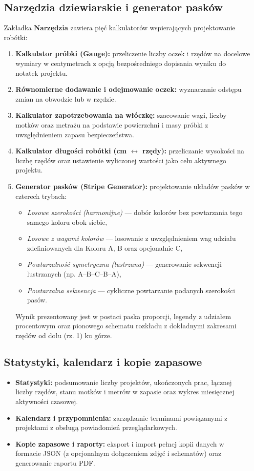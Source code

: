 \documentclass[11pt, a4paper]{article}
\begin{document}
\subsection{Narzędzia dziewiarskie i generator pasków}
Zakładka \textbf{Narzędzia} zawiera pięć kalkulatorów wspierających projektowanie robótki:
\begin{enumerate}
  \item \textbf{Kalkulator próbki (Gauge):} przeliczenie liczby oczek i rzędów na docelowe wymiary w centymetrach z opcją bezpośredniego dopisania wyniku do notatek projektu.
  \item \textbf{Równomierne dodawanie i odejmowanie oczek:} wyznaczanie odstępu zmian na obwodzie lub w rzędzie.
  \item \textbf{Kalkulator zapotrzebowania na włóczkę:} szacowanie wagi, liczby motków oraz metrażu na podstawie powierzchni i masy próbki z uwzględnieniem zapasu bezpieczeństwa.
  \item \textbf{Kalkulator długości robótki (cm $\leftrightarrow$ rzędy):} przeliczanie wysokości na liczbę rzędów oraz ustawienie wyliczonej wartości jako celu aktywnego projektu.
  \item \textbf{Generator pasków (Stripe Generator):} projektowanie układów pasków w czterech trybach:
    \begin{itemize}
      \item \textit{Losowe szerokości (harmonijne)} --- dobór kolorów bez powtarzania tego samego koloru obok siebie,
      \item \textit{Losowe z wagami kolorów} --- losowanie z uwzględnieniem wag udziału zdefiniowanych dla Koloru A, B oraz opcjonalnie C,
      \item \textit{Powtarzalność symetryczna (lustrzana)} --- generowanie sekwencji lustrzanych (np. A--B--C--B--A),
      \item \textit{Powtarzalna sekwencja} --- cykliczne powtarzanie podanych szerokości pasów.
    \end{itemize}
    Wynik prezentowany jest w postaci paska proporcji, legendy z udziałem procentowym oraz pionowego schematu rozkładu z dokładnymi zakresami rzędów od dołu (rz. 1) ku górze.
\end{enumerate}

\subsection{Statystyki, kalendarz i kopie zapasowe}
\begin{itemize}
  \item \textbf{Statystyki:} podsumowanie liczby projektów, ukończonych prac, łącznej liczby rzędów, stanu motków i metrów w zapasie oraz wykres miesięcznej aktywności czasowej.
  \item \textbf{Kalendarz i przypomnienia:} zarządzanie terminami powiązanymi z projektami z obsługą powiadomień przeglądarkowych.
  \item \textbf{Kopie zapasowe i raporty:} eksport i import pełnej kopii danych w formacie JSON (z opcjonalnym dołączeniem zdjęć i schematów) oraz generowanie raportu PDF.
\end{itemize}
\end{document}
